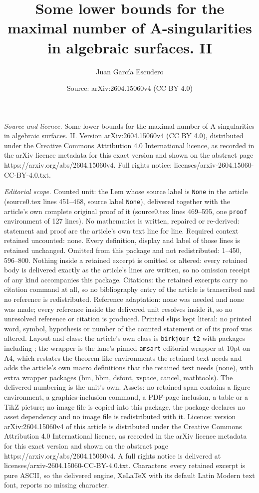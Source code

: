 \documentclass[10pt,a4paper]{amsart}
\title[Some lower bounds for the maximal number of A-singularities ]{Some lower bounds for the maximal number of A-singularities in algebraic surfaces. II}
\author{Juan Garc\'ia Escudero}
\date{Source: arXiv:2604.15060v4 (CC BY 4.0)}
\begin{document}
\maketitle

\noindent\emph{Source and licence.} Some lower bounds for the maximal number of A-singularities in algebraic surfaces. II. Version arXiv:2604.15060v4 (CC BY 4.0), distributed under the Creative Commons Attribution 4.0 International licence, as recorded in the arXiv licence metadata for this exact version and shown on the abstract page https://arxiv.org/abs/2604.15060v4. Full rights notice: licenses/arxiv-2604.15060-CC-BY-4.0.txt.\par\smallskip

\noindent\textit{Editorial scope.} Counted unit: the Lem whose source label is \texttt{None} in the article (source0.tex lines 451--468, source label \texttt{None}), delivered together with the article's own complete original proof of it (source0.tex lines 469--595, one \texttt{proof} environment of 127 lines). No mathematics is written, repaired or re-derived: statement and proof are the article's own text line for line. Required context retained uncounted: none. Every definition, display and label of those lines is retained unchanged. Omitted from this package and not redistributed: 1--450, 596--800. Nothing inside a retained excerpt is omitted or altered: every retained body is delivered exactly as the article's lines are written, so no omission receipt of any kind accompanies this package. Citations: the retained excerpts carry no citation command at all, so no bibliography entry of the article is transcribed and no reference is redistributed. Reference adaptation: none was needed and none was made; every reference inside the delivered unit resolves inside it, so no unresolved reference or citation is produced. Printed slips kept literal: no printed word, symbol, hypothesis or number of the counted statement or of its proof was altered. Layout and class: the article's own class is \texttt{birkjour\_t2} with packages including ; the wrapper is the lane's pinned \texttt{amsart} editorial wrapper at 10pt on A4, which restates the theorem-like environments the retained text needs and adds the article's own macro definitions that the retained text needs (none), with extra wrapper packages (bm, bbm, dsfont, xspace, cancel, mathtools). The delivered numbering is the unit's own. Assets: no retained span contains a figure environment, a graphics-inclusion command, a PDF-page inclusion, a table or a TikZ picture; no image file is copied into this package, the package declares no asset dependency and no image file is redistributed with it. Licence: version arXiv:2604.15060v4 of this article is distributed under the Creative Commons Attribution 4.0 International licence, as recorded in the arXiv licence metadata for this exact version and shown on the abstract page https://arxiv.org/abs/2604.15060v4. A full rights notice is delivered at licenses/arxiv-2604.15060-CC-BY-4.0.txt. Characters: every retained excerpt is pure ASCII, so the delivered engine, XeLaTeX with its default Latin Modern text font, reports no missing character.
\end{document}

